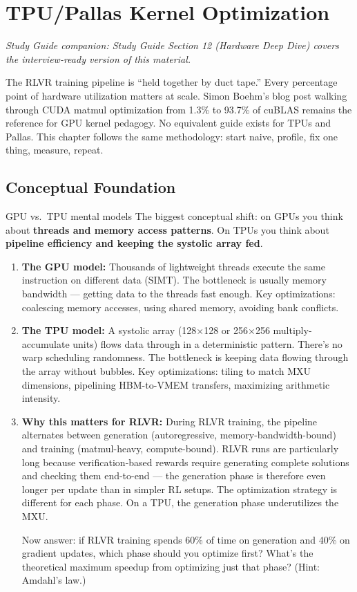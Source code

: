 \section{TPU/Pallas Kernel Optimization}

\smallskip\noindent\textit{Study Guide companion: Study Guide Section 12 (Hardware Deep Dive) covers the interview-ready version of this material.}
\smallskip

The RLVR training pipeline is ``held together by duct tape.'' Every percentage point of hardware utilization matters at scale. Simon Boehm's blog post walking through CUDA matmul optimization from 1.3\% to 93.7\% of cuBLAS remains the reference for GPU kernel pedagogy. No equivalent guide exists for TPUs and Pallas. This chapter follows the same methodology: start naive, profile, fix one thing, measure, repeat.

\subsection{Conceptual Foundation}

\begin{thinkfirst}{GPU vs.\ TPU mental models}
The biggest conceptual shift: on GPUs you think about \textbf{threads and memory access patterns}. On TPUs you think about \textbf{pipeline efficiency and keeping the systolic array fed}.

\begin{enumerate}
  \item \textbf{The GPU model:} Thousands of lightweight threads execute the same instruction on different data (SIMT). The bottleneck is usually memory bandwidth --- getting data to the threads fast enough. Key optimizations: coalescing memory accesses, using shared memory, avoiding bank conflicts.

  \item \textbf{The TPU model:} A systolic array (128$\times$128 or 256$\times$256 multiply-accumulate units) flows data through in a deterministic pattern. There's no warp scheduling randomness. The bottleneck is keeping data flowing through the array without bubbles. Key optimizations: tiling to match MXU dimensions, pipelining HBM-to-VMEM transfers, maximizing arithmetic intensity.

  \item \textbf{Why this matters for RLVR:} During RLVR training, the pipeline alternates between generation (autoregressive, memory-bandwidth-bound) and training (matmul-heavy, compute-bound). RLVR runs are particularly long because verification-based rewards require generating complete solutions and checking them end-to-end --- the generation phase is therefore even longer per update than in simpler RL setups. The optimization strategy is different for each phase. On a TPU, the generation phase underutilizes the MXU.

  Now answer: if RLVR training spends 60\% of time on generation and 40\% on gradient updates, which phase should you optimize first? What's the theoretical maximum speedup from optimizing just that phase? (Hint: Amdahl's law.)
\end{enumerate}
\end{thinkfirst}

